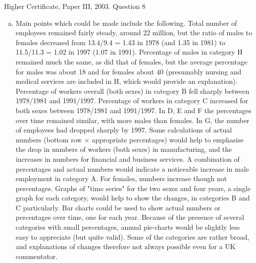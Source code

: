 \documentclass[a4paper,12pt]{article}
\begin{document}
Higher Certificate, Paper III, 2003. Question 8
\begin{enumerate}[(a)]
\item Main points which could be made include the following.
Total number of employees remained fairly steady, around 22 million, but the
ratio of males to females decreased from 13.4/9.4 = 1.43 in 1978 (and 1.35 in
1981) to 11.5/11.3 = 1.02 in 1997 (1.07 in 1991).
Percentage of males in category H remained much the same, as did that of
females, but the average percentage for males was about 18 and for females
about 40 (presumably nursing and medical services are included in H, which
would provide an explanation).
Percentage of workers overall (both sexes) in category B fell sharply between
1978/1981 and 1991/1997.
Percentage of workers in category C increased for both sexes between
1978/1981 and 1991/1997.
In D, E and F the percentages over time remained similar, with more males
than females.
In G, the number of employees had dropped sharply by 1997.
Some calculations of actual numbers (bottom row × appropriate percentages) would
help to emphasise the drop in numbers of workers (both sexes) in manufacturing, and
the increases in numbers for financial and business services.
A combination of percentages and actual numbers would indicate a noticeable
increase in male employment in category A. For females, numbers increase though
not percentages.
Graphs of "time series" for the two sexes and four years, a single graph for each
category, would help to show the changes, in categories B and C particularly.
Bar charts could be used to show actual numbers or percentages over time, one for
each year. Because of the presence of several categories with small percentages,
annual pie-charts would be slightly less easy to appreciate (but quite valid).
Some of the categories are rather broad, and explanations of changes therefore not
always possible even for a UK commentator.
\end{enumerate}
\end{document}
